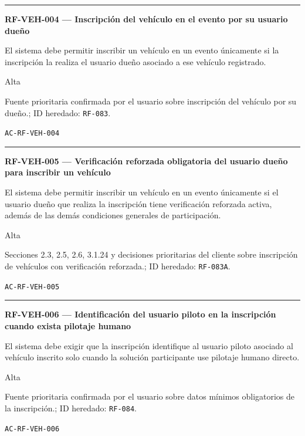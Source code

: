 \documentclass[10pt,letterpaper]{article}
\begin{document}
\vspace{0.25em}\hrule\vspace{0.65em}
\noindent\textbf{RF-VEH-004 --- Inscripción del vehículo en el evento por su usuario dueño}\par
\begin{description}[style=nextline,leftmargin=3.15cm,labelwidth=2.8cm,font=\normalfont\bfseries]
\item[Obligación] El sistema debe permitir inscribir un vehículo en un evento únicamente si la inscripción la realiza el usuario dueño asociado a ese vehículo registrado.
\item[Prioridad] Alta
\item[Procedencia] Fuente prioritaria confirmada por el usuario sobre inscripción del vehículo por su dueño.; ID heredado: \texttt{RF-083}.
\item[Verificación] \texttt{AC-RF-VEH-004}
\end{description}
\vspace{0.25em}\hrule\vspace{0.65em}
\noindent\textbf{RF-VEH-005 --- Verificación reforzada obligatoria del usuario dueño para inscribir un vehículo}\par
\begin{description}[style=nextline,leftmargin=3.15cm,labelwidth=2.8cm,font=\normalfont\bfseries]
\item[Obligación] El sistema debe permitir inscribir un vehículo en un evento únicamente si el usuario dueño que realiza la inscripción tiene verificación reforzada activa, además de las demás condiciones generales de participación.
\item[Prioridad] Alta
\item[Procedencia] Secciones 2.3, 2.5, 2.6, 3.1.24 y decisiones prioritarias del cliente sobre inscripción de vehículos con verificación reforzada.; ID heredado: \texttt{RF-083A}.
\item[Verificación] \texttt{AC-RF-VEH-005}
\end{description}
\vspace{0.25em}\hrule\vspace{0.65em}
\noindent\textbf{RF-VEH-006 --- Identificación del usuario piloto en la inscripción cuando exista pilotaje humano}\par
\begin{description}[style=nextline,leftmargin=3.15cm,labelwidth=2.8cm,font=\normalfont\bfseries]
\item[Obligación] El sistema debe exigir que la inscripción identifique al usuario piloto asociado al vehículo inscrito solo cuando la solución participante use pilotaje humano directo.
\item[Prioridad] Alta
\item[Procedencia] Fuente prioritaria confirmada por el usuario sobre datos mínimos obligatorios de la inscripción.; ID heredado: \texttt{RF-084}.
\item[Verificación] \texttt{AC-RF-VEH-006}
\end{description}
\end{document}
